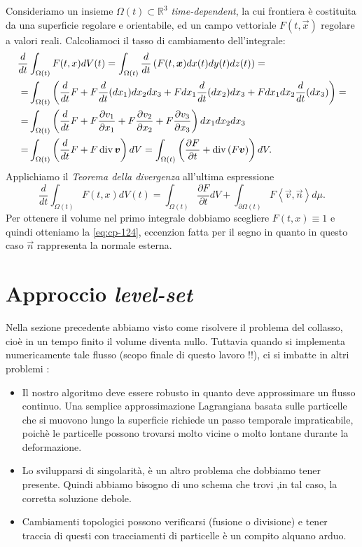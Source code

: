 \begin{osservazione}
\label{oss:cp-122}
Consideriamo un insieme $\Omega(t)\subset\mathbb{R}^3$ \emph{time-dependent}, la cui frontiera è costituita da una superficie regolare e orientabile, ed un campo vettoriale $F(t,\vec{x})$ regolare a valori reali. Calcoliamoci il tasso di cambiamento dell'integrale:
\[
\begin{aligned}
\frac{d}{dt}&\int_{\Omega(t)}F(t,x)dV(t) = \int_{\Omega(t)}\frac{d}{dt}\left(F(t,\bm{x})dx(t)dy(t)dz(t)\right)=\\
 =&\int_{\Omega(t)}\left(\frac{d}{dt}F + F\frac{d}{dt}(dx_1)dx_2dx_3 + Fdx_1\frac{d}{dt}(dx_2)dx_3 + Fdx_1dx_2\frac{d}{dt}(dx_3)\right)=\\
=&\int_{\Omega(t)}\left(\frac{d}{dt}F + F\frac{\partial v_1}{\partial x_1}+ F\frac{\partial v_2}{\partial x_2} + F\frac{\partial v_3}{\partial x_3}\right)dx_1dx_2dx_3\\
=& \int_{\Omega(t)}\left(\frac{d}{dt}F + F\operatorname{div}{\bm{v}}\right)dV = \int_{\Omega(t)}\left(\frac{\partial F}{\partial t} + \operatorname{div}{(F\bm{v})}\right)dV.
\end{aligned}
\]
Applichiamo il \emph{Teorema della divergenza} all'ultima espressione
\[
\frac{d}{dt}\int_{\Omega(t)}F(t,x)dV(t)=\int_{\Omega(t)}\frac{\partial F}{\partial t}dV + \int_{\partial \Omega(t)}F\left<\vec{v},\vec{n}\right>d\mu.
\]
Per ottenere il volume nel primo integrale dobbiamo scegliere $F(t,x)\equiv 1$ e quindi otteniamo la \eqref{eq:cp-124}, eccenzion fatta per il segno in quanto in questo caso $\vec{n}$ rappresenta la normale esterna.
\end{osservazione}
%
%
%
%
\section{Approccio \emph{level-set}}  

Nella sezione precedente abbiamo visto come risolvere il problema del collasso, cioè in un tempo finito il volume diventa nullo. Tuttavia quando si implementa numericamente tale flusso (scopo finale di questo lavoro !!), ci si imbatte in altri problemi :
\begin{itemize}

  \item Il nostro algoritmo deve essere robusto in quanto deve approssimare un flusso continuo. Una semplice approssimazione Lagrangiana basata sulle particelle che si muovono lungo la superficie richiede un passo temporale impraticabile, poichè le particelle possono trovarsi molto vicine o molto lontane durante la deformazione.

   \item Lo svilupparsi di singolarità, è un altro problema che dobbiamo tener presente. Quindi abbiamo bisogno di uno schema che trovi ,in tal caso, la corretta soluzione debole.
   
   \item Cambiamenti topologici possono verificarsi (fusione o divisione) e tener traccia di questi con tracciamenti di particelle è un compito alquano arduo.

\end{itemize}

